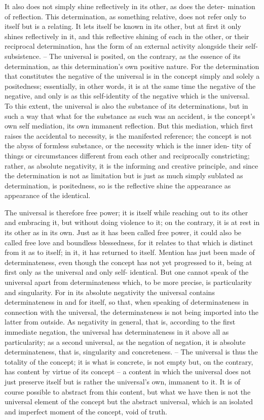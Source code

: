 It also does not simply shine reflectively in its other, as does the deter-
mination of reflection. This determination, as something relative, does not
refer only to itself but is a relating. It lets itself be known in its other, but
at first it only shines reflectively in it, and this reflective shining of each in
the other, or their reciprocal determination, has the form of an external
activity alongside their self-subsistence. – The universal is posited, on the
contrary, as the essence of its determination, as this determination's own
positive nature. For the determination that constitutes the negative of the
universal is in the concept simply and solely a positedness; essentially, in
other words, it is at the same time the negative of the negative, and only
is as this self-identity of the negative which is the universal. To this extent,
the universal is also the substance of its determinations, but in such a way
that what for the substance as such was an accident, is the concept's own
self mediation, its own immanent reflection. But this mediation, which first
raises the accidental to necessity, is the manifested reference; the concept is
not the abyss of formless substance, or the necessity which is the inner iden-
tity of things or circumstances different from each other and reciprocally
constricting; rather, as absolute negativity, it is the informing and creative
principle, and since the determination is not as limitation but is just as
much simply sublated as determination, is positedness, so is the reflective
shine the appearance as appearance of the identical.

The universal is therefore free power; it is itself while reaching out to its
other and embracing it, but without doing violence to it; on the contrary,
it is at rest in its other as in its own. Just as it has been called free power, it
could also be called free love and boundless blessedness, for it relates to that
which is distinct from it as to itself; in it, it has returned to itself.
Mention has just been made of determinateness, even though the concept
has not yet progressed to it, being at first only as the universal and only self-
identical. But one cannot speak of the universal apart from determinateness
which, to be more precise, is particularity and singularity. For in its absolute
negativity the universal contains determinateness in and for itself, so that,
when speaking of determinateness in connection with the universal, the
determinateness is not being imported into the latter from outside. As
negativity in general, that is, according to the first immediate negation, the
universal has determinateness in it above all as particularity; as a second
universal, as the negation of negation, it is absolute determinateness, that
is, singularity and concreteness. – The universal is thus the totality of the
concept; it is what is concrete, is not empty but, on the contrary, has content
by virtue of its concept – a content in which the universal does not just
preserve itself but is rather the universal's own, immanent to it. It is of
course possible to abstract from this content, but what we have then is not
the universal element of the concept but the abstract universal, which is an
isolated and imperfect moment of the concept, void of truth.

